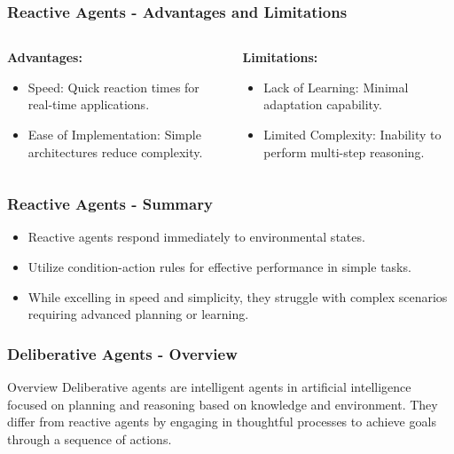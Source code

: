 \documentclass[aspectratio=169]{beamer}
\begin{document}
\begin{frame}[fragile]
    \frametitle{Reactive Agents - Advantages and Limitations}
    \begin{columns}
        \begin{column}{0.5\textwidth}
            \textbf{Advantages:}
            \begin{itemize}
                \item Speed: Quick reaction times for real-time applications.
                \item Ease of Implementation: Simple architectures reduce complexity.
            \end{itemize}
        \end{column}
        \begin{column}{0.5\textwidth}
            \textbf{Limitations:}
            \begin{itemize}
                \item Lack of Learning: Minimal adaptation capability.
                \item Limited Complexity: Inability to perform multi-step reasoning.
            \end{itemize}
        \end{column}
    \end{columns}
\end{frame}

\begin{frame}[fragile]
    \frametitle{Reactive Agents - Summary}
    \begin{itemize}
        \item Reactive agents respond immediately to environmental states.
        \item Utilize condition-action rules for effective performance in simple tasks.
        \item While excelling in speed and simplicity, they struggle with complex scenarios requiring advanced planning or learning.
    \end{itemize}
\end{frame}

\begin{frame}[fragile]
    \frametitle{Deliberative Agents - Overview}
    \begin{block}{Overview}
        Deliberative agents are intelligent agents in artificial intelligence focused on planning and reasoning based on knowledge and environment. They differ from reactive agents by engaging in thoughtful processes to achieve goals through a sequence of actions.
    \end{block}
\end{frame}
\end{document}
